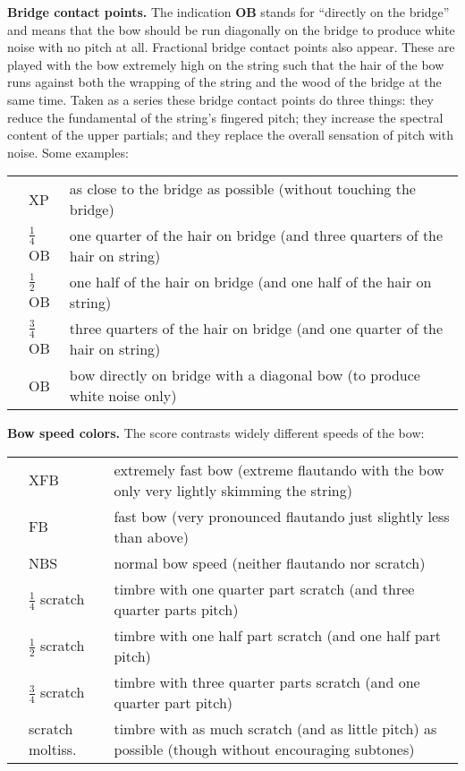 \documentclass[10pt]{article}
\begin{document}
\begin{textblock}{23}
\textbf{Bridge contact points.} The indication \textbf{OB} stands for
``directly on the bridge'' and means that the bow should be run diagonally on
the bridge to produce white noise with no pitch at all. Fractional bridge
contact points also appear. These are played with the bow extremely high on the
string such that the hair of the bow runs against both the wrapping of the
string and the wood of the bridge at the same time. Taken as a series these
bridge contact points do three things: they reduce the
fundamental of the string's fingered pitch; they increase the spectral content
of the upper partials; and they replace the overall sensation of pitch with
noise. Some examples:

\begin{tabu}{l l l}
\phantom{M} & XP & as close to the bridge as possible (without touching the bridge) \\
            & $\frac{1}{4}$OB & one quarter of the hair on bridge (and three quarters of the hair on string) \\
            & $\frac{1}{2}$OB & one half of the hair on bridge (and one half of the hair on string) \\
            & $\frac{3}{4}$OB & three quarters of the hair on bridge (and one quarter of the hair on string) \\
            & OB & bow directly on bridge with a diagonal bow (to produce white noise only) \\
\end{tabu}

\textbf{Bow speed colors.} The score contrasts widely different speeds of the bow:
 
\begin{tabu}{l l l}
\phantom{M} & XFB & extremely fast bow (extreme flautando with the bow only very lightly skimming the string) \\
            & FB & fast bow (very pronounced flautando just slightly less than above) \\
            & NBS & normal bow speed (neither flautando nor scratch) \\
            & $\frac{1}{4}$ scratch & timbre with one quarter part scratch (and three quarter parts pitch) \\
            & $\frac{1}{2}$ scratch & timbre with one half part scratch (and one half part pitch) \\
            & $\frac{3}{4}$ scratch & timbre with three quarter parts scratch (and one quarter part pitch) \\
            & scratch moltiss. & timbre with as much scratch (and as little pitch) as possible (though without encouraging subtones) \\
\end{tabu}


\end{textblock}
\end{document}
